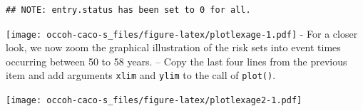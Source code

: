 \documentclass[
]{book}
\newenvironment{Shaded}{\begin{snugshade}}{\end{snugshade}}
\newcommand{\AttributeTok}[1]{\textcolor[rgb]{0.13,0.29,0.53}{#1}}
\newcommand{\ConstantTok}[1]{\textcolor[rgb]{0.56,0.35,0.01}{#1}}
\newcommand{\DecValTok}[1]{\textcolor[rgb]{0.00,0.00,0.81}{#1}}
\newcommand{\FunctionTok}[1]{\textcolor[rgb]{0.13,0.29,0.53}{\textbf{#1}}}
\newcommand{\NormalTok}[1]{#1}
\newcommand{\SpecialCharTok}[1]{\textcolor[rgb]{0.81,0.36,0.00}{\textbf{#1}}}
\newcommand{\StringTok}[1]{\textcolor[rgb]{0.31,0.60,0.02}{#1}}
\begin{document}
\begin{verbatim}
## NOTE: entry.status has been set to 0 for all.
\end{verbatim}

\begin{Shaded}
\end{Shaded}

\texttt{[image: occoh-caco-s\_files/figure-latex/plotlexage-1.pdf]}
- For a closer look, we now
zoom the graphical illustration of the risk sets into
event times occurring between 50 to 58 years. --
Copy the last four lines from the previous item and add arguments \texttt{xlim} and \texttt{ylim}
to the call of \texttt{plot()}.

\begin{Shaded}
\end{Shaded}

\texttt{[image: occoh-caco-s\_files/figure-latex/plotlexage2-1.pdf]}
\end{document}
